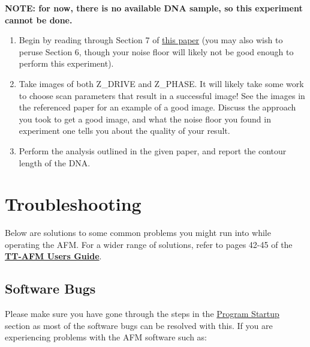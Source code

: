 \documentclass{../lab}
\newcommand{\afmuserguide}{\href{https://berkeley-physics111b.github.io/assets/pdf/oldwebsitestructure/AFMImages/TT_AFM\%20User-Guide-V2.2-600DPI.pdf}{\textbf{TT-AFM Users Guide}}}
\begin{document}
\textbf{NOTE: for now, there is no available DNA sample, so this experiment cannot be done.}


\begin{enumerate}
    \item Begin by reading through Section 7 of \href{https://arxiv.org/abs/1512.05662}{this paper} (you may also wish to peruse Section 6, though your noise floor will likely not be good enough to perform this experiment).
    \item Take images of both Z\_DRIVE and Z\_PHASE. It will likely take some work to choose scan parameters that result in a successful image! See the images in the referenced paper for an example of a good image. Discuss the approach you took to get a good image, and what the noise floor you found in experiment one tells you about the quality of your result.
    \item Perform the analysis outlined in the given paper, and report the contour length of the DNA.
\end{enumerate}

\pagebreak
\section{Troubleshooting}
\label{sec:Troubleshooting}

Below are solutions to some common problems you might run into while operating the AFM. For a wider range of solutions, refer to pages 42-45 of the \afmuserguide.

\subsection{Software Bugs}

Please make sure you have gone through the steps in the \hyperref[subsec:TurnOnInstrumentsAndOpenPrograms]{Program Startup} section as most of the software bugs can be resolved with this. If you are experiencing problems with the AFM software such as:
\end{document}
